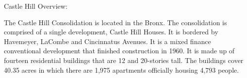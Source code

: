 Castle Hill Overview:   

    

The Castle Hill Consolidation is located in the Bronx. The consolidation is comprised of a single development, Castle Hill Houses. It is bordered by Havemeyer, LaCombe and Cincinnatus Avenues. It is a mixed finance conventional development that finished construction in 1960. It is made up of fourteen residential buildings that are 12 and 20-stories tall. The buildings cover 40.35 acres in which there are 1,975 apartments officially housing 4,793 people.     